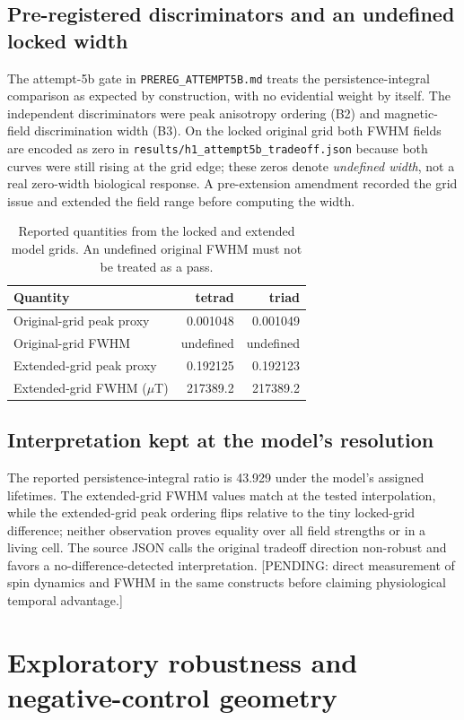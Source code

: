 \subsection{Pre-registered discriminators and an undefined locked width}
The attempt-5b gate in \texttt{PREREG\_ATTEMPT5B.md} treats the persistence-integral comparison as expected by construction, with no evidential weight by itself. The independent discriminators were peak anisotropy ordering (B2) and magnetic-field discrimination width (B3). On the locked original grid both FWHM fields are encoded as zero in \texttt{results/h1\_attempt5b\_tradeoff.json} because both curves were still rising at the grid edge; these zeros denote \emph{undefined width}, not a real zero-width biological response. A pre-extension amendment recorded the grid issue and extended the field range before computing the width.\begin{table}[!htbp]\centering\small\caption{Reported quantities from the locked and extended model grids. An undefined original FWHM must not be treated as a pass.}\begin{tabular}{p{5.4cm}rr}\hline Quantity & tetrad & triad \\\hline
Original-grid peak proxy & 0.001048 & 0.001049 \\
Original-grid FWHM & undefined & undefined \\
Extended-grid peak proxy & 0.192125 & 0.192123 \\
Extended-grid FWHM ($\mu$T) & 217389.2 & 217389.2 \\
\hline\end{tabular}\end{table}
\subsection{Interpretation kept at the model's resolution}
The reported persistence-integral ratio is 43.929 under the model's assigned lifetimes. The extended-grid FWHM values match at the tested interpolation, while the extended-grid peak ordering flips relative to the tiny locked-grid difference; neither observation proves equality over all field strengths or in a living cell. The source JSON calls the original tradeoff direction non-robust and favors a no-difference-detected interpretation. [PENDING: direct measurement of spin dynamics and FWHM in the same constructs before claiming physiological temporal advantage.]

\section{Exploratory robustness and negative-control geometry}
